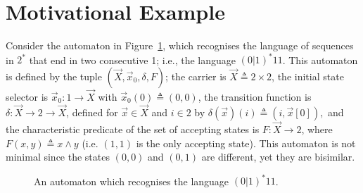 \section{Motivational Example}
\label{sec:Latent:Motivation}
Consider the automaton in Figure~\ref{fig:ExampleLatent}, which recognises the language of sequences in $2^*$ that end in two consecutive 1; i.e., the language $(0|1)^*11$. 
This automaton is defined by the tuple $(\vec{X},\vec{x}_0,\delta,F)$; the carrier is $\vec{X}\triangleq2\times2$, the initial state selector is $\vec{x}_0\colon1\rightarrow \vec{X}$ with $\vec{x}_0(0)\triangleq(0,0)$, the transition function is $\delta\colon \vec{X}\rightarrow 2\rightarrow\vec{X}$, defined for $\vec{x}\in \vec{X}$ and $i \in 2$ by $\delta(\vec{x})(i)\triangleq(i,\vec{x}[0]),$ and the characteristic predicate of the set of accepting states is $F\colon\vec{X}\rightarrow 2$, where $F(x,y)\triangleq x \land y$
(i.e. $(1,1)$ is the only accepting state). This automaton is not minimal since the states $(0,0)$ and $(0,1)$ are different, yet they are bisimilar. 

\begin{figure}[t]
    \centering
    \caption{An automaton which recognises the language $(0|1)^*11$.}
    \label{fig:ExampleLatent}
\end{figure}

